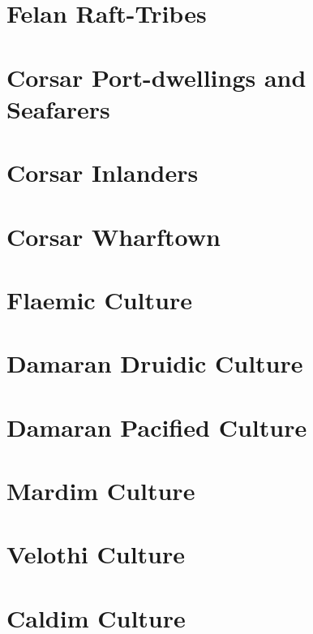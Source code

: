 \section{Felan Raft-Tribes}

\section{Corsar Port-dwellings and Seafarers}

\section{Corsar Inlanders}

\section{Corsar Wharftown}

\section{Flaemic Culture} %

\section{Damaran Druidic Culture}

\section{Damaran Pacified Culture}

\section{Mardim Culture} %

\section{Velothi Culture} %

\section{Caldim Culture} %